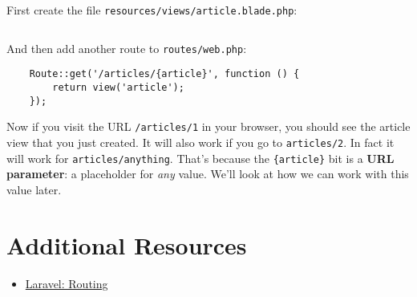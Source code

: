 First create the file \texttt{resources/views/article.blade.php}:

\inputminted{html}{07-routing/figures/02-article.blade.php}

And then add another route to \texttt{routes/web.php}:

\begin{verbatim}
    Route::get('/articles/{article}', function () {
        return view('article');
    });
\end{verbatim}

Now if you visit the URL \texttt{/articles/1} in your browser, you should see the article view that you just created. It will also work if you go to \texttt{articles/2}. In fact it will work for \texttt{articles/anything}. That's because the \texttt{\{article\}} bit is a \textbf{URL parameter}: a placeholder for \textit{any} value. We'll look at how we can work with this value later.

\section{Additional Resources}

\begin{itemize}[leftmargin=*]
    \item \href{http://laravel.com/docs/master/routing}{Laravel: Routing}
\end{itemize}
